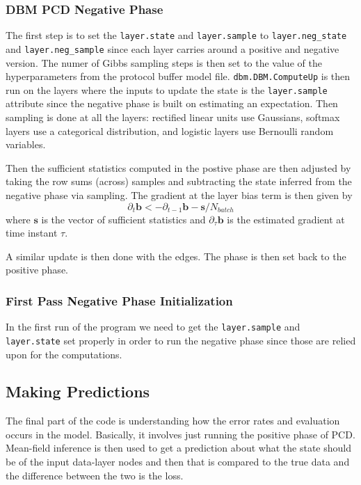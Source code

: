 \documentclass{article} %
\begin{document}
\subsubsection{DBM PCD Negative Phase}

The first step is to set the \texttt{layer.state} and \texttt{layer.sample}
to \texttt{layer.neg\_state} and \texttt{layer.neg\_sample} since each layer carries around a positive and negative version.
The numer of Gibbs sampling steps is then set to the value of the hyperparameters from the protocol buffer model file.
\texttt{dbm.DBM.ComputeUp} is then run on the layers where the inputs to update the state is the \texttt{layer.sample}
attribute since the negative phase is built on estimating an expectation.  Then sampling is done at all the layers:
rectified linear units use Gaussians, softmax layers use a categorical distribution, and logistic layers use Bernoulli
random variables.

Then the sufficient statistics computed in the postive phase are then adjusted by taking the row sums (across) samples
and subtracting the state inferred from the negative phase via sampling.  The gradient at the layer bias term is then given by
\begin{equation}
\partial_t \mathbf{b} <- \partial_{t-1}\mathbf{b} - \mathbf{s}/N_{batch}
\end{equation}
where $\mathbf{s}$ is the vector of sufficient statistics and $\partial_{\tau}\mathbf{b}$ is the estimated gradient at
time instant $\tau$.

A similar update is then done with the edges.  The phase is then set back to the positive phase.

\subsubsection{First Pass Negative Phase Initialization}

In the first run of the program we need to get the \texttt{layer.sample} and \texttt{layer.state} set properly in order
to run the negative phase since those are relied upon for the computations.

\subsection{Making Predictions}

The final part of the code is understanding how the error rates and evaluation occurs in the model. Basically, it involves
just running the positive phase of PCD.  Mean-field inference is then used to get a prediction about what the state should
be of the input data-layer nodes and then that is compared to the true data and the difference between the two is the loss.
\end{document}
